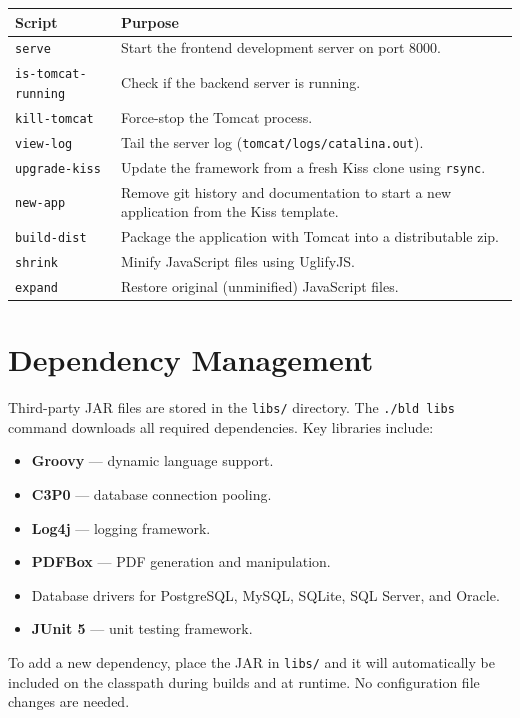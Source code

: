 \begin{longtable}{P{3.8cm}P{6.7cm}}
\toprule
\textbf{Script} & \textbf{Purpose} \\
\midrule
\endhead
\texttt{serve} & Start the frontend development server on port 8000. \\
\texttt{is-tomcat-running} & Check if the backend server is running. \\
\texttt{kill-tomcat} & Force-stop the Tomcat process. \\
\texttt{view-log} & Tail the server log (\texttt{tomcat/logs/catalina.out}). \\
\texttt{upgrade-kiss} & Update the framework from a fresh Kiss clone using \texttt{rsync}. \\
\texttt{new-app} & Remove git history and documentation to start a new application from the Kiss template. \\
\texttt{build-dist} & Package the application with Tomcat into a distributable zip. \\
\texttt{shrink} & Minify JavaScript files using UglifyJS. \\
\texttt{expand} & Restore original (unminified) JavaScript files. \\
\bottomrule
\end{longtable}

\section{Dependency Management}
\label{sec:build-deps}

Third-party JAR files are stored in the \texttt{libs/} directory.  The \texttt{./bld libs} command downloads all required dependencies.  Key libraries include:

\begin{itemize}
  \item \textbf{Groovy} --- dynamic language support.
  \item \textbf{C3P0} --- database connection pooling.
  \item \textbf{Log4j} --- logging framework.
  \item \textbf{PDFBox} --- PDF generation and manipulation.
  \item Database drivers for PostgreSQL, MySQL, SQLite, SQL Server, and Oracle.
  \item \textbf{JUnit 5} --- unit testing framework.
\end{itemize}

\begin{tipbox}
To add a new dependency, place the JAR in \texttt{libs/} and it will automatically be included on the classpath during builds and at runtime.  No configuration file changes are needed.
\end{tipbox}

